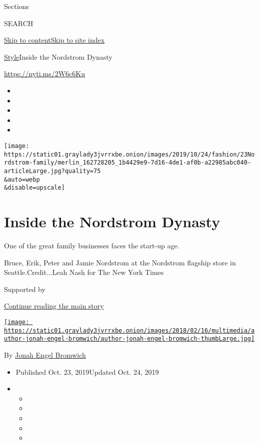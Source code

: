 Sections

SEARCH

\protect\hyperlink{site-content}{Skip to
content}\protect\hyperlink{site-index}{Skip to site index}

\href{/section/style}{Style}\textbar{}Inside the Nordstrom Dynasty

\url{https://nyti.ms/2W6c6Ku}

\begin{itemize}
\item
\item
\item
\item
\item
\end{itemize}

\texttt{[image: https://static01.graylady3jvrrxbe.onion/images/2019/10/24/fashion/23Nordstrom-family/merlin\_162728205\_1b4429e9-7d16-4de1-af0b-a22985abc040-articleLarge.jpg?quality=75\\\&auto=webp\\\&disable=upscale]}

\hypertarget{inside-the-nordstrom-dynasty}{%
\section{Inside the Nordstrom
Dynasty}\label{inside-the-nordstrom-dynasty}}

One of the great family businesses faces the start-up age.

Bruce, Erik, Peter and Jamie Nordstrom at the Nordstrom flagship store
in Seattle.Credit...Leah Nash for The New York Times

Supported by

\protect\hyperlink{after-sponsor}{Continue reading the main story}

\href{https://www.nytimes3xbfgragh.onion/by/jonah-engel-bromwich}{\texttt{[image: https://static01.graylady3jvrrxbe.onion/images/2018/02/16/multimedia/author-jonah-engel-bromwich/author-jonah-engel-bromwich-thumbLarge.jpg]}}

By
\href{https://www.nytimes3xbfgragh.onion/by/jonah-engel-bromwich}{Jonah
Engel Bromwich}

\begin{itemize}
\item
  Published Oct. 23, 2019Updated Oct. 24, 2019
\item
  \begin{itemize}
  \item
  \item
  \item
  \item
  \item
  \end{itemize}
\end{itemize}

